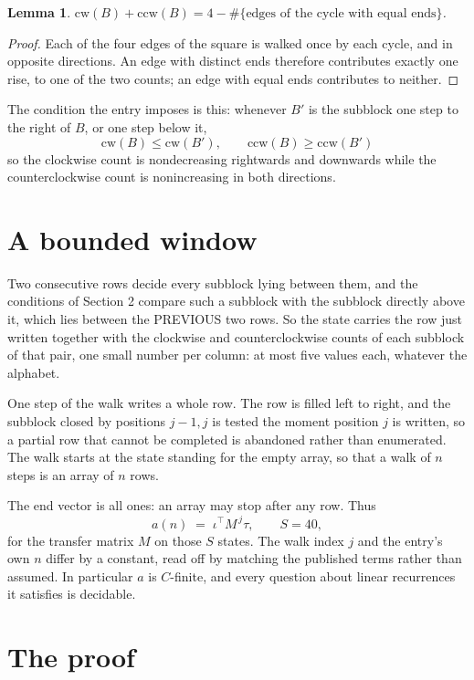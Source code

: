 \documentclass[11pt,a4paper]{article}
\theoremstyle{plain}
\newtheorem{lemma}[theorem]{Lemma}
\theoremstyle{definition}
\begin{document}
\begin{lemma}\label{lem:sum}
$\mathrm{cw}(B)+\mathrm{ccw}(B)=4-\#\{\text{edges of the cycle with equal ends}\}$.
\end{lemma}

\begin{proof}
Each of the four edges of the square is walked once by each cycle, and in opposite directions.
An edge with distinct ends therefore contributes exactly one rise, to one of the two counts;
an edge with equal ends contributes to neither.
\end{proof}

The condition the entry imposes is this: whenever $B'$ is the subblock one step to the right of $B$, or one step below it, 
\[
\mathrm{cw}(B)\le\mathrm{cw}(B'),\qquad \mathrm{ccw}(B)\ge\mathrm{ccw}(B')
\]
so the clockwise count is nondecreasing rightwards and downwards while the counterclockwise count is nonincreasing in both directions.

\section{A bounded window}

Two consecutive rows decide every subblock lying between them, and the conditions of Section 2 compare such a subblock with the subblock directly above it, which lies between the PREVIOUS two rows. So the state carries the row just written together with the clockwise and counterclockwise counts of each subblock of that pair, one small number per column: at most five values each, whatever the alphabet.

One step of the walk writes a whole row. The row is filled left to right, and the subblock
closed by positions $j-1,j$ is tested the moment position $j$ is written, so a partial row that
cannot be completed is abandoned rather than enumerated. The walk starts at the state standing
for the empty array, so that a walk of $n$ steps is an array of $n$ rows.

The end vector is all ones: an array may stop after any row. Thus
\[
a(n)\;=\;\iota^{\!\top}M^{\,j}\tau ,\qquad S=40,
\]
for the transfer matrix $M$ on those $S$ states. The walk index $j$ and the entry's own $n$
differ by a constant, read off by matching the published terms rather than assumed. In
particular $a$ is $C$-finite, and every question about linear recurrences it satisfies is
decidable.

\section{The proof}
\end{document}
